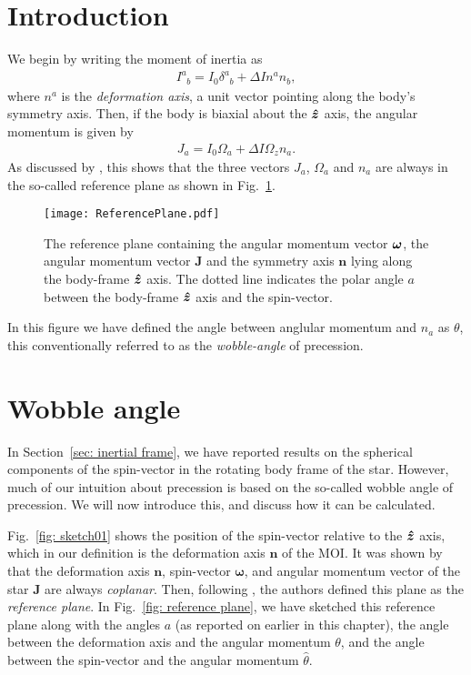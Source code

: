 \documentclass[../full_thesis/full_thesis.tex]{subfiles}
\begin{document}
\section{Introduction}
We begin by writing the moment of inertia as
\begin{align}
I^{a}_{\;\;b} = I_{0} \delta^{a}_{\;\;b} + \Delta I n^a n_b,
\end{align}
where $n^a$ is the \emph{deformation axis}, a unit vector pointing along the
body's symmetry axis. Then, if the body is biaxial about the $\boldsymbol{\hat{z}}$ axis,
the angular momentum is given by
\begin{align}
J_{a} = I_0 \Omega_a + \Delta I \Omega_z n_a.
\end{align}
As discussed by \citet{Pines1972}, this shows that the three vectors $J_a$,
$\Omega_a$ and $n_a$ are always in the so-called reference plane as shown in
Fig.~\ref{fig: reference plane}.
\begin{figure}[htb]
    \texttt{[image: ReferencePlane.pdf]}
    \caption{The reference plane containing the angular momentum vector $\boldsymbol{\omega}$,
    the angular momentum vector $\mathbf{J}$ and the symmetry axis $\mathbf{n}$ lying along the
    body-frame $\boldsymbol{\hat{z}}$ axis. The dotted line indicates the polar angle $a$ between
    the body-frame $\boldsymbol{\hat{z}}$ axis and the spin-vector.}
    \label{fig: reference plane}
\end{figure}
In this figure we have defined the angle between anglular momentum and $n_a$ as
$\theta$, this conventionally referred to as the \emph{wobble-angle} of
precession.


\section{Wobble angle}
In Section~\ref{sec: inertial frame}, we have reported results on the spherical
components of the spin-vector in the rotating body frame of the star. However,
much of our intuition about precession is based on the so-called wobble angle
of precession. We will now introduce this, and discuss how it can be
calculated.

Fig.~\ref{fig: sketch01} shows the position of the spin-vector relative to the
$\boldsymbol{\hat{z}}$ axis, which in our definition is the deformation axis $\mathbf{n}$ of the
MOI. It was shown by \citet{Jones2001} that the deformation axis $\mathbf{n}$,
spin-vector $\mathbf{\omega}$, and angular momentum vector of the star
$\mathbf{J}$ are always \emph{coplanar}. Then, following \citet{Pines1972}, the
authors defined this plane as the \emph{reference plane}. In Fig.~\ref{fig:
reference plane}, we have sketched this reference plane along with the angles
$a$ (as reported on earlier in this chapter), the angle between the deformation
axis and the angular momentum $\theta$, and the angle between the spin-vector
and the angular momentum $\hat{\theta}$.
\end{document}
